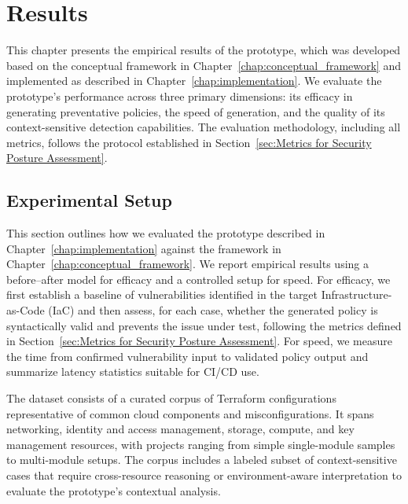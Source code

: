 
\chapter{Results}\label{chap:results}

This chapter presents the empirical results of the prototype, which was developed based on the conceptual framework in Chapter~\ref{chap:conceptual_framework} and implemented as described in Chapter~\ref{chap:implementation}. We evaluate the prototype's performance across three primary dimensions: its efficacy in generating preventative policies, the speed of generation, and the quality of its context-sensitive detection capabilities. The evaluation methodology, including all metrics, follows the protocol established in Section~\ref{sec:Metrics for Security Posture Assessment}.

\section{Experimental Setup}\label{sec:experimental-setup}

This section outlines how we evaluated the prototype described in Chapter~\ref{chap:implementation} against the framework in Chapter~\ref{chap:conceptual_framework}. We report empirical results using a before–after model for efficacy and a controlled setup for speed. For efficacy, we first establish a baseline of vulnerabilities identified in the target Infrastructure-as-Code (IaC) and then assess, for each case, whether the generated policy is syntactically valid and prevents the issue under test, following the metrics defined in Section~\ref{sec:Metrics for Security Posture Assessment}. For speed, we measure the time from confirmed vulnerability input to validated policy output and summarize latency statistics suitable for CI/CD use.

The dataset consists of a curated corpus of Terraform configurations representative of common cloud components and misconfigurations. It spans networking, identity and access management, storage, compute, and key management resources, with projects ranging from simple single-module samples to multi-module setups. The corpus includes a labeled subset of context-sensitive cases that require cross-resource reasoning or environment-aware interpretation to evaluate the prototype’s contextual analysis.

